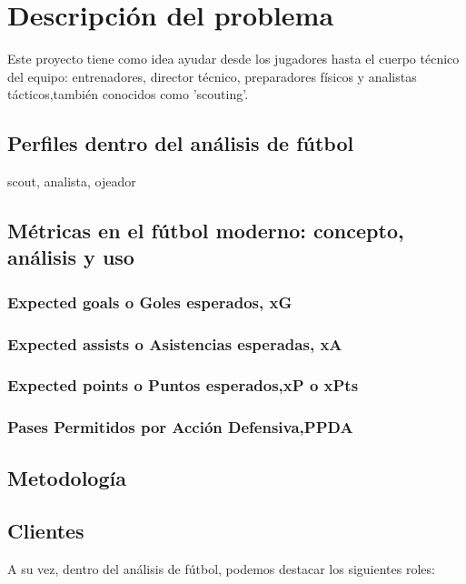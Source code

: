 \chapter{Descripción del problema}

Este proyecto tiene como idea ayudar desde los jugadores hasta 
el cuerpo técnico del equipo: entrenadores, director técnico, preparadores 
físicos y analistas tácticos,también conocidos como 'scouting'.

\section{Perfiles dentro del análisis de fútbol}

scout, analista, ojeador 


\section{Métricas en el fútbol moderno: concepto, análisis y uso}

\subsection{Expected goals o Goles esperados, xG}


\subsection{Expected assists o Asistencias esperadas, xA}


\subsection{Expected points o Puntos esperados,xP o xPts}


\subsection{Pases Permitidos por Acción Defensiva,PPDA}


\section{Metodología}


\section{Clientes}
A su vez, dentro del análisis de fútbol, podemos destacar los siguientes roles:

